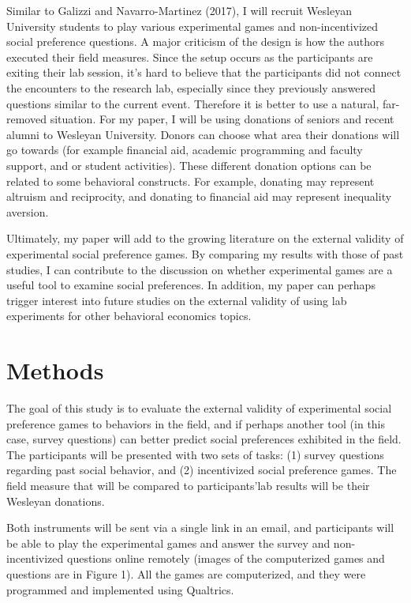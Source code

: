 \documentclass{article}
\begin{document}
Similar to Galizzi and Navarro-Martinez (2017), I will recruit Wesleyan University students to play various experimental games and non-incentivized social preference questions.  A major criticism of the design is how the authors executed their field measures. Since the setup occurs as the participants are exiting their lab session, it\rq s hard to believe that the participants did not connect the encounters to the research lab, especially since they previously answered questions similar to the current event. Therefore it is better to use a natural, far-removed situation. For my paper, I will be using donations of seniors and recent alumni to Wesleyan University. Donors can choose what area their donations will go towards (for example financial aid, academic programming and faculty support, and or student activities). These different donation options can be related to some behavioral constructs. For example, donating may represent altruism and reciprocity, and donating to financial aid may represent inequality aversion. 
 
Ultimately, my paper will add to the growing literature on the external validity of experimental social preference games. By comparing my results with those of past studies, I can contribute to the discussion on whether experimental games are a useful tool to examine social preferences. In addition, my paper can perhaps trigger interest into future studies on the external validity of using lab experiments for other behavioral economics topics. 


\section{Methods}

The goal of this study is to evaluate the external validity of experimental social preference games to behaviors in the field, and if perhaps another tool (in this case, survey questions) can better predict social preferences exhibited in the field. The participants will be presented with two sets of tasks: (1) survey questions regarding past social behavior, and (2) incentivized social preference games. The field measure that will be compared to participants\rq lab results will be their Wesleyan donations. 
 
Both instruments will be sent via a single link in an email, and participants will be able to play the experimental games and answer the survey and non-incentivized questions online remotely (images of the computerized games and questions are in Figure 1). All the games are computerized, and they were programmed and implemented using Qualtrics. 
 
\end{document}
